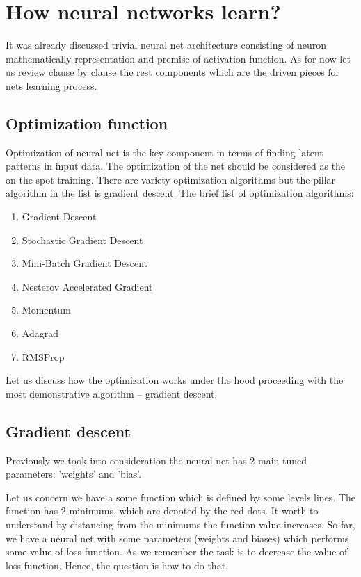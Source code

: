 \section{How neural networks learn?}
It was already discussed trivial neural net architecture consisting of neuron mathematically representation and premise of activation function. As for now let us review clause by clause the rest components which are the driven pieces for nets learning process.

\subsection{Optimization function}
Optimization of neural net is the key component in terms of finding latent patterns in input data. The optimization of the net should be considered as the on-the-spot training. There are variety optimization algorithms but the pillar algorithm in the list is gradient descent.
The brief list of optimization algorithms:
\begin{enumerate}
    \item Gradient Descent
    \item Stochastic Gradient Descent
    \item Mini-Batch Gradient Descent
    \item Nesterov Accelerated Gradient
    \item Momentum
    \item Adagrad
    \item RMSProp
\end{enumerate}
Let us discuss how the optimization works under the hood proceeding with the most demonstrative algorithm -- gradient descent.

\subsection{Gradient descent}
Previously we took into consideration the neural net has 2 main tuned parameters: 'weights' and 'bias'.

Let us concern we have a some function which is defined by some levels lines. The function has 2 minimums, which are denoted by the red dots.  It worth to understand by distancing from the minimums the function value increases. 
So far, we have a neural net with some parameters (weights and biases) which performs some value of loss function. As we remember the task is to decrease the value of loss function. Hence, the question is how to do that.

